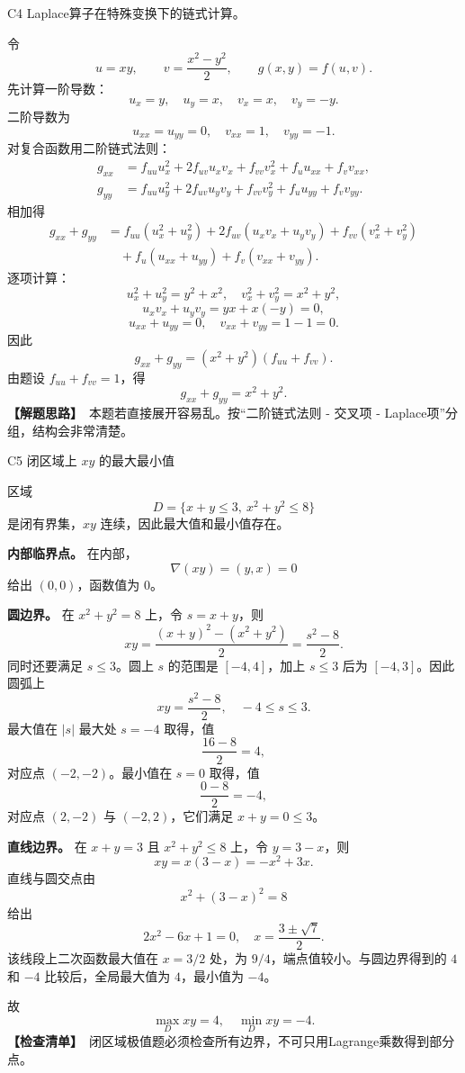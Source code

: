 \documentclass[UTF8,zihao=-4,openany]{ctexbook}
\newcommand{\grad}{\nabla}
\newcommand{\thinking}{\textcolor{mainblue}{\bfseries【解题思路】}}
\newcommand{\checklist}{\textcolor{theogreen}{\bfseries【检查清单】}}
\begin{document}
\begin{solutionbox}{C4 Laplace算子在特殊变换下的链式计算}。

令
\[
u=xy,
\qquad
v=\frac{x^2-y^2}{2},
\qquad
g(x,y)=f(u,v).
\]
先计算一阶导数：
\[
u_x=y,
\quad u_y=x,
\quad v_x=x,
\quad v_y=-y.
\]
二阶导数为
\[
u_{xx}=u_{yy}=0,
\quad v_{xx}=1,
\quad v_{yy}=-1.
\]
对复合函数用二阶链式法则：
\[
\begin{aligned}
g_{xx}&=f_{uu}u_x^2+2f_{uv}u_xv_x+f_{vv}v_x^2+f_u u_{xx}+f_vv_{xx},\\
g_{yy}&=f_{uu}u_y^2+2f_{uv}u_yv_y+f_{vv}v_y^2+f_u u_{yy}+f_vv_{yy}.
\end{aligned}
\]
相加得
\[
\begin{aligned}
g_{xx}+g_{yy}
&=f_{uu}(u_x^2+u_y^2)+2f_{uv}(u_xv_x+u_yv_y)+f_{vv}(v_x^2+v_y^2)\\
&\quad +f_u(u_{xx}+u_{yy})+f_v(v_{xx}+v_{yy}).
\end{aligned}
\]
逐项计算：
\[
u_x^2+u_y^2=y^2+x^2,
\quad
v_x^2+v_y^2=x^2+y^2,
\]
\[
u_xv_x+u_yv_y=yx+x(-y)=0,
\]
\[
u_{xx}+u_{yy}=0,
\quad
v_{xx}+v_{yy}=1-1=0.
\]
因此
\[
g_{xx}+g_{yy}=(x^2+y^2)(f_{uu}+f_{vv}).
\]
由题设 $f_{uu}+f_{vv}=1$，得
\[
\boxed{g_{xx}+g_{yy}=x^2+y^2.}
\]
\thinking\ 本题若直接展开容易乱。按“二阶链式法则 - 交叉项 - Laplace项”分组，结构会非常清楚。
\end{solutionbox}

\begin{solutionbox}{C5 闭区域上 $xy$ 的最大最小值}

区域
\[
D=\{x+y\le3,\ x^2+y^2\le8\}
\]
是闭有界集，$xy$ 连续，因此最大值和最小值存在。

\textbf{内部临界点。} 在内部，
\[
\grad(xy)=(y,x)=0
\]
给出 $(0,0)$，函数值为 $0$。

\textbf{圆边界。} 在 $x^2+y^2=8$ 上，令 $s=x+y$，则
\[
xy=\frac{(x+y)^2-(x^2+y^2)}2=\frac{s^2-8}{2}.
\]
同时还要满足 $s\le3$。圆上 $s$ 的范围是 $[-4,4]$，加上 $s\le3$ 后为 $[-4,3]$。因此圆弧上
\[
xy=\frac{s^2-8}{2},\quad -4\le s\le3.
\]
最大值在 $|s|$ 最大处 $s=-4$ 取得，值
\[
\frac{16-8}{2}=4,
\]
对应点 $(-2,-2)$。最小值在 $s=0$ 取得，值
\[
\frac{0-8}{2}=-4,
\]
对应点 $(2,-2)$ 与 $(-2,2)$，它们满足 $x+y=0\le3$。

\textbf{直线边界。} 在 $x+y=3$ 且 $x^2+y^2\le8$ 上，令 $y=3-x$，则
\[
xy=x(3-x)=-x^2+3x.
\]
直线与圆交点由
\[
x^2+(3-x)^2=8
\]
给出
\[
2x^2-6x+1=0,
\quad
x=\frac{3\pm\sqrt7}{2}.
\]
该线段上二次函数最大值在 $x=3/2$ 处，为 $9/4$，端点值较小。与圆边界得到的 $4$ 和 $-4$ 比较后，全局最大值为 $4$，最小值为 $-4$。

故
\[
\boxed{\max_Dxy=4,
\quad
\min_Dxy=-4.}
\]
\checklist\ 闭区域极值题必须检查所有边界，不可只用Lagrange乘数得到部分点。
\end{solutionbox}
\end{document}
